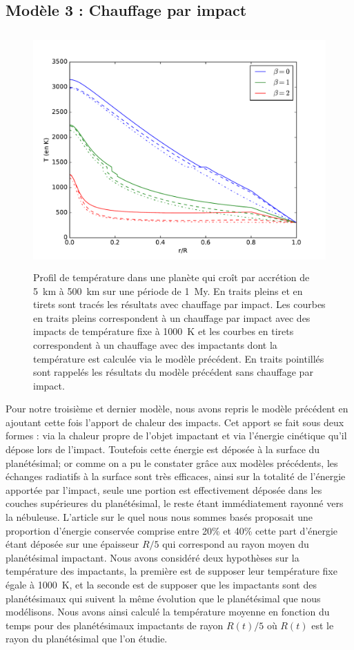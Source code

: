 \documentclass[10pt,a4paper]{article}
\numberwithin{equation}{section}
\begin{document}
\subsection{Modèle 3 : Chauffage par impact}

\begin{figure}[h!]
\centering
\includegraphics[height=9cm]{./figures/graph_sim3.pdf}
\caption{Profil de température dans une planète qui croît par accrétion de \SI{5}{km} à \SI{500}{km} sur une période de \SI{1}{My}. En traits pleins et en tirets sont tracés les résultats avec chauffage par impact. Les courbes en traits pleins correspondent à un chauffage par impact avec des impacts de température fixe à \SI{1000}{K} et les courbes en tirets correspondent à un chauffage avec des impactants dont la température est calculée via le modèle précédent. En traits pointillés sont rappelés les résultats du modèle précédent sans chauffage par impact.}
\label{fig3}
\end{figure}

Pour notre troisième et dernier modèle, nous avons repris le modèle précédent en ajoutant cette fois l'apport de chaleur des impacts. Cet apport se fait sous deux formes : via la chaleur propre de l'objet impactant et via l'énergie cinétique qu'il dépose lors de l'impact. Toutefois cette énergie est déposée à la surface du planétésimal; or comme on a pu le constater grâce aux modèles précédents, les échanges radiatifs à la surface sont très efficaces, ainsi sur la totalité de l'énergie apportée par l'impact, seule une portion est effectivement déposée dans les couches supérieures du planétésimal, le reste étant immédiatement rayonné vers la nébuleuse. L'article sur le quel nous nous sommes basés proposait une proportion d'énergie conservée comprise entre 20\% et 40\% cette part d'énergie étant déposée sur une épaisseur $R/5$ qui correspond au rayon moyen du planétésimal impactant.
Nous avons considéré deux hypothèses sur la température des impactants, la première est de supposer leur température fixe égale à \SI{1000}{K}, et la seconde est de supposer que les impactants sont des planétésimaux qui suivent la même évolution que le planétésimal que nous modélisons. Nous avons ainsi calculé la température moyenne en fonction du temps pour des planétésimaux impactants de rayon $R(t)/5$ où $R(t)$ est le rayon du planétésimal que l'on étudie.
\end{document}
